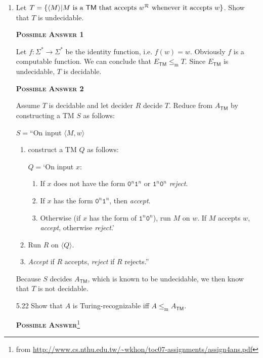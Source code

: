 \begin{enumerate}[start=8,font=\bfseries,label=5.\arabic*]

    \item Let $T = \{ \langle M \rangle | \text{$M$ is a \textsf{TM} that accepts $w^\mathcal R$ whenever it accepts $w$} \}$. Show that $T$ is undecidable.
    
    \textsc{\textbf{Possible Answer 1}}
    
    Let $f:\Sigma^\ast\rightarrow\Sigma^\ast$ be the identity function, i.e. $f(w)=w$. Obviously $f$ is a computable function. We can conclude that $E_\textsf{TM} \le_\mathrm m T$. Since $E_\textsf{TM}$ is undecidable, $T$ is decidable.
    
    \textsc{\textbf{Possible Answer 2}}
    
    Assume $T$ is decidable and let decider $R$ decide $T$. Reduce from $A_\textsf{TM}$ by constructing a \textsf{TM} $S$ as follows:
    
    $S = \text{``}$On input $\langle M, w \rangle$
    \begin{enumerate}[label=\arabic*.]
        \item construct a \textsf{TM} $Q$ as follows:
        
        $Q = \text{`}$On input $x$:
        \begin{enumerate}[label=\arabic*.]
            \item If $x$ does not have the form $\texttt{0}^n\texttt{1}^n$ or $\texttt{1}^n\texttt{0}^n$ \emph{reject}.
            \item If $x$ has the form $\texttt{0}^n\texttt{1}^n$, then \emph{accept}.
            \item Otherwise (if $x$ has the form of $\texttt{1}^n\texttt{0}^n$), run $M$ on $w$. If $M$ accepts $w$, \emph{accept}, otherwise \emph{reject}.'
        \end{enumerate}
        \item Run $R$ on $\langle Q \rangle$.
        \item \emph{Accept} if $R$ accepts, \emph{reject} if $R$ rejects.''
    \end{enumerate}
    Because $S$ decides $A_\textsf{TM}$, which is known to be undecidable, we then know that $T$ is not decidable. 
    
    \item[5.22] Show that $A$ is Turing-recognizable iff $A \le_\mathrm m A_\textsf{TM}$.
    
    \textsc{\textbf{Possible Answer}}\footnote{from \url{http://www.cs.nthu.edu.tw/~wkhon/toc07-assignments/assign4ans.pdf}}
    

\end{enumerate}
